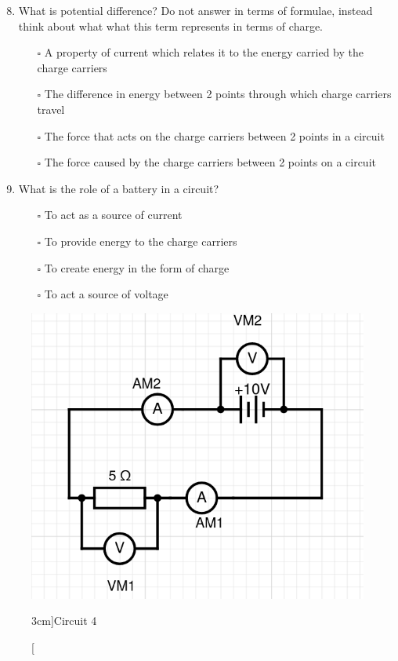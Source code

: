 \documentclass[a4paper,openany,nobib]{tufte-book}
\begin{document}
\begin{enumerate}
	\setcounter{enumi}{7}
		\item What is potential difference? Do not answer in terms of formulae, instead think about what what this term represents in terms of charge.
			\begin{itemize}
				\item[$\square$]A property of current which relates it to the energy carried by the charge carriers
				\item[$\square$]The difference in energy between 2 points through which charge carriers travel
				\item[$\square$]The force that acts on the charge carriers between 2 points in a circuit
				\item[$\square$]The force caused by the charge carriers between 2 points on a circuit
			\end{itemize}
		\item What is the role of a battery in a circuit?
		\begin{itemize}
			\item[$\square$]To act as a source of current
			\item[$\square$]To provide energy to the charge carriers
			\item[$\square$]To create energy in the form of charge
			\item[$\square$]To act a source of voltage
		\end{itemize}
\end{enumerate}
\newpage
\begin{figure}[h!]
	\center
	\includegraphics[width=\linewidth]{Vary}
	\caption[][3cm]{Circuit 4}
\end{figure}
\end{document}
